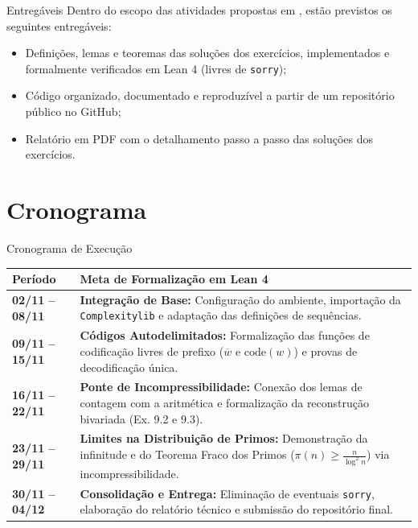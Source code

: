 \documentclass[10pt, aspectratio=43]{beamer}
\begin{document}
\begin{frame}{Entregáveis}
    Dentro do escopo das atividades propostas em \cite{schoning1998kolmogorov}, estão previstos os seguintes entregáveis:
    \medskip

    \begin{tcolorbox}[pucbox, title=Entregáveis do Projeto]
        \begin{itemize}
            \item Definições, lemas e teoremas das soluções dos exercícios, implementados e formalmente verificados em Lean 4 (livres de \texttt{sorry});
            \item Código organizado, documentado e reproduzível a partir de um repositório público no GitHub;
            \item Relatório em PDF com o detalhamento passo a passo das soluções dos exercícios.
        \end{itemize}
    \end{tcolorbox}
\end{frame}

\section{Cronograma}

\begin{frame}{Cronograma de Execução}
\small
\renewcommand{\arraystretch}{1.5}
\begin{table}[]
\centering
\begin{tabular}{@{}p{2.5cm}|p{8.3cm}@{}}
\toprule
\textbf{Período} & \textbf{Meta de Formalização em Lean 4} \\ \midrule

\textbf{02/11 -- 08/11} & \textbf{Integração de Base:} Configuração do ambiente, importação da \texttt{Complexitylib} e adaptação das definições de sequências. \\ \hline

\textbf{09/11 -- 15/11} & \textbf{Códigos Autodelimitados:} Formalização das funções de codificação livres de prefixo ($\overline{w}$ e $\text{code}(w)$) e provas de decodificação única. \\ \hline

\textbf{16/11 -- 22/11} & \textbf{Ponte de Incompressibilidade:} Conexão dos lemas de contagem com a aritmética e formalização da reconstrução bivariada (Ex. 9.2 e 9.3). \\ \hline

\textbf{23/11 -- 29/11} & \textbf{Limites na Distribuição de Primos:} Demonstração da infinitude e do Teorema Fraco dos Primos ($\pi(n) \ge \frac{n}{\log^2 n}$) via incompressibilidade. \\ \hline

\textbf{30/11 -- 04/12} & \textbf{Consolidação e Entrega:} Eliminação de eventuais \texttt{sorry}, elaboração do relatório técnico e submissão do repositório final. \\ 
\bottomrule
\end{tabular}
\end{table}
\end{frame}
\end{document}
